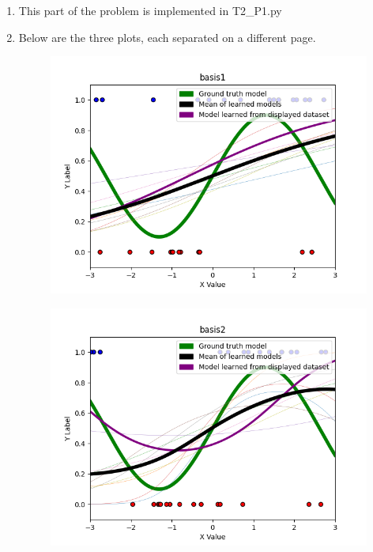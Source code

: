 \documentclass[submit]{harvardml}
\begin{document}
\begin{enumerate}

\item 

This part of the problem is implemented in T2\_P1.py

\item

Below are the three plots, each separated on a different page.

\newpage
\begin{figure}[h]
\includegraphics[scale=0.8]{basis1}
\centering
\end{figure}
\newpage

\begin{figure}[h]
\includegraphics[scale=0.8]{basis2}
\centering
\end{figure}
\newpage


\end{enumerate}
\end{document}

